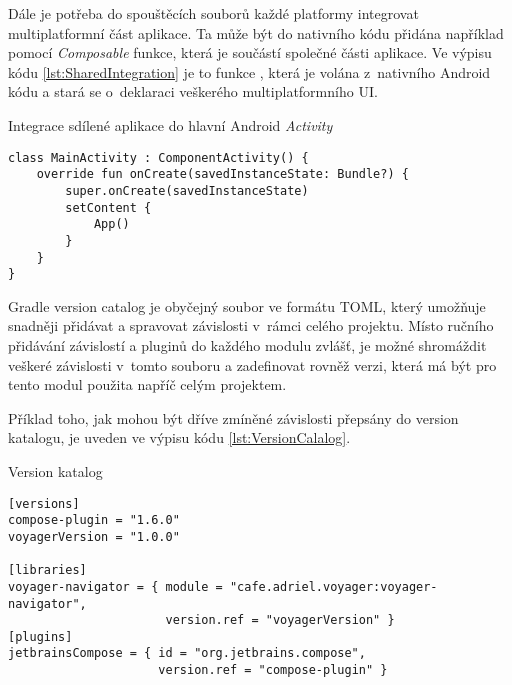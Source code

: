 Dále je potřeba do spouštěcích souborů každé platformy integrovat multiplatformní část aplikace. Ta může být do nativního kódu přidána
například pomocí \textit{Composable} funkce, která je součástí společné části aplikace.
Ve výpisu kódu \ref{lst:SharedIntegration} je to funkce , která je volána z~nativního Android kódu a stará se
o~deklaraci veškerého multiplatformního UI.
\begin{listing}[H]
  \caption{Integrace sdílené aplikace do hlavní Android \textit{Activity}}\label{lst:SharedIntegration}
  \begin{verbatim}
class MainActivity : ComponentActivity() {
    override fun onCreate(savedInstanceState: Bundle?) {
        super.onCreate(savedInstanceState)
        setContent {
            App()
        }
    }
}
\end{verbatim}
\end{listing}






Gradle version catalog je obyčejný soubor ve formátu TOML, který umožňuje snadněji přidávat a spravovat závislosti v~rámci celého projektu. 
Místo ručního přidávání závislostí a pluginů do každého modulu zvlášť, je možné shromáždit veškeré závislosti v~tomto souboru a zadefinovat rovněž
verzi, která má být pro tento modul použita napříč celým projektem. \cite{versionCatalog}

Příklad toho, jak mohou být dříve zmíněné závislosti přepsány do version
katalogu, je uveden ve výpisu kódu \ref{lst:VersionCalalog}.

\begin{listing}[H]
\caption{Version katalog}\label{lst:VersionCalalog}
\begin{verbatim}
[versions]
compose-plugin = "1.6.0"
voyagerVersion = "1.0.0"
    
[libraries]
voyager-navigator = { module = "cafe.adriel.voyager:voyager-navigator", 
                      version.ref = "voyagerVersion" }
[plugins]
jetbrainsCompose = { id = "org.jetbrains.compose",
                     version.ref = "compose-plugin" }
\end{verbatim}
\end{listing}



